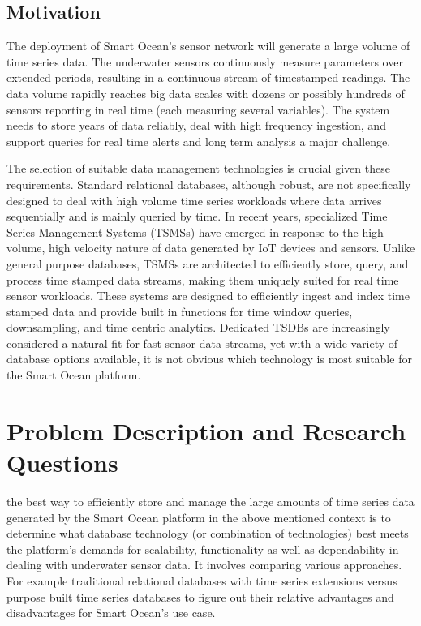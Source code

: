 \newpage
\subsection{Motivation}
The deployment of Smart Ocean's sensor network will generate a large volume of
time series data. The underwater sensors continuously measure parameters over
extended periods, resulting in a continuous stream of timestamped readings. The
data volume rapidly reaches big data scales with dozens or possibly hundreds of
sensors reporting in real time (each measuring several variables). The system
needs to store years of data reliably, deal with high frequency ingestion, and
support queries for real time alerts and long term analysis a major challenge.

The selection of suitable data management technologies is crucial given these
requirements. Standard relational databases, although robust, are not
specifically designed to deal with high volume time series workloads where data
arrives sequentially and is mainly queried by time. In recent years,
specialized Time Series Management Systems (TSMSs) have emerged in response to
the high volume, high velocity nature of data generated by IoT devices and
sensors. Unlike general purpose databases, TSMSs are architected to efficiently
store, query, and process time stamped data streams, making them uniquely
suited for real time sensor workloads\cite{Jensen2017}. These systems are
designed to efficiently ingest and index time stamped data and provide built in
functions for time window queries, downsampling, and time centric analytics.
Dedicated TSDBs are increasingly considered a natural fit for fast sensor data
streams, yet with a wide variety of database options available, it is not
obvious which technology is most suitable for the Smart Ocean platform.

\newpage
\section{Problem Description and Research Questions}
the best way to efficiently store and manage the large amounts of time series
data generated by the Smart Ocean platform in the above mentioned context is to
determine what database technology (or combination of technologies) best meets
the platform's demands for scalability, functionality as well as dependability
in dealing with underwater sensor data. It involves comparing various
approaches. For example traditional relational databases with time series
extensions versus purpose built time series databases to figure out their
relative advantages and disadvantages for Smart Ocean's use case.

